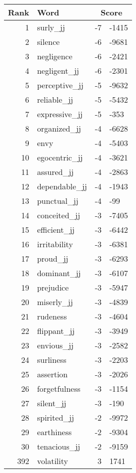 \begin{longtable}[!htbp]{| rlr@{.}l |}
    \hline
    \textbf{Rank} & \textbf{Word} & \multicolumn{2}{c|}{\textbf{Score}} \\
    \hline
    \endhead
    1 & surly\_jj & -7 & -1415 \\
    2 & silence & -6 & -9681 \\
    3 & negligence & -6 & -2421 \\
    4 & negligent\_jj & -6 & -2301 \\
    5 & perceptive\_jj & -5 & -9632 \\
    6 & reliable\_jj & -5 & -5432 \\
    7 & expressive\_jj & -5 & -353 \\
    8 & organized\_jj & -4 & -6628 \\
    9 & envy & -4 & -5403 \\
    10 & egocentric\_jj & -4 & -3621 \\
    11 & assured\_jj & -4 & -2863 \\
    12 & dependable\_jj & -4 & -1943 \\
    13 & punctual\_jj & -4 & -99 \\
    14 & conceited\_jj & -3 & -7405 \\
    15 & efficient\_jj & -3 & -6442 \\
    16 & irritability & -3 & -6381 \\
    17 & proud\_jj & -3 & -6293 \\
    18 & dominant\_jj & -3 & -6107 \\
    19 & prejudice & -3 & -5947 \\
    20 & miserly\_jj & -3 & -4839 \\
    21 & rudeness & -3 & -4604 \\
    22 & flippant\_jj & -3 & -3949 \\
    23 & envious\_jj & -3 & -2582 \\
    24 & surliness & -3 & -2203 \\
    25 & assertion & -3 & -2026 \\
    26 & forgetfulness & -3 & -1154 \\
    27 & silent\_jj & -3 & -190 \\
    28 & spirited\_jj & -2 & -9972 \\
    29 & earthiness & -2 & -9304 \\
    30 & tenacious\_jj & -2 & -9159 \\
    392 & volatility & 3 & 1741 \\

\end{longtable}
